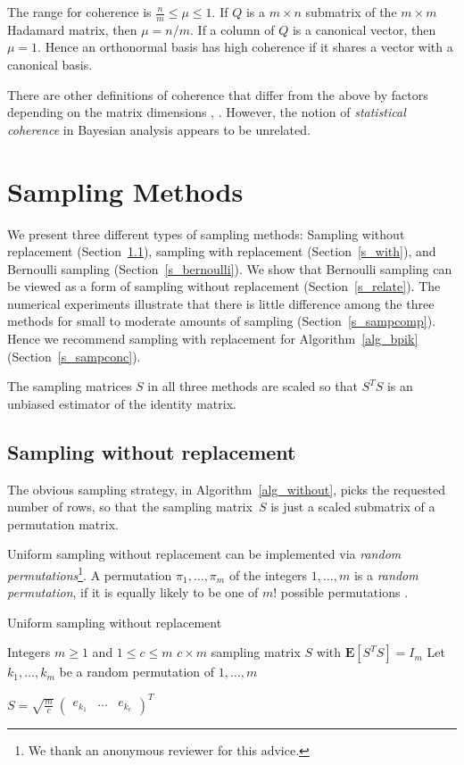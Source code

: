 \documentclass{siamltex}
\begin{document}
The range for coherence is $\tfrac{n}{m}\leq \mu\leq 1$.  If $Q$ is a
$m\times n$ submatrix of the $m\times m$ Hadamard matrix, then
$\mu=n/m$.  If a column of $Q$ is a canonical vector, then $\mu=1$.
Hence an orthonormal basis has high coherence if it shares a vector
with a canonical basis.  
 

There are other
definitions of coherence that differ from the above by factors
depending on the matrix dimensions \cite[Definition 1]{Recht11},
\cite[Definition 1]{TalR10}. However, the notion of 
\textit{statistical coherence} in Bayesian analysis
\cite{Lind78} appears to be unrelated.

 

\section{Sampling Methods}\label{s_samp}
We present three different types of sampling methods: 
Sampling without replacement
(Section~\ref{s_without}),
sampling with replacement  (Section~\ref{s_with}),
and Bernoulli sampling (Section~\ref{s_bernoulli}).
We show that Bernoulli sampling 
can be viewed as a form of sampling
without replacement (Section~\ref{s_relate}).
The numerical experiments   illustrate
that there is little difference among the three methods
for small to moderate amounts of sampling (Section~\ref{s_sampcomp}). 
Hence we recommend sampling with replacement 
for Algorithm~\ref{alg_bpik} (Section~\ref{s_sampconc}).

The sampling matrices $S$ in all three methods are scaled so that $S^TS$
is an unbiased estimator of the identity matrix.

\subsection{Sampling without replacement}\label{s_without}
The obvious sampling strategy, in Algorithm~\ref{alg_without},
picks the requested number of
rows, so that the sampling matrix~$S$ is just a scaled submatrix of a 
permutation matrix.

Uniform sampling without replacement can be implemented via 
\textit{random permutations}\footnote{We thank an
anonymous reviewer for this advice.}.
A permutation $\pi_1,\ldots, \pi_m$ of the integers $1,\ldots, m$
is a \textit{random permutation}, if it is equally likely to be one of $m!$
possible permutations \cite[pages 41 and 48]{MitzUpf}.

\begin{algorithm}
\caption{Uniform sampling without replacement
\cite{GT11,GrN10}}\label{alg_without}
\begin{algorithmic}
\REQUIRE Integers $m\geq 1$ and $1\leq c\leq m$
\ENSURE $c\times m$ sampling matrix $S$ with ${\mathbf{E}}[S^TS]=I_m$
\STATE
\STATE Let $k_1,\ldots,k_m$ be a random permutation of $1,\ldots, m$
\smallskip

\STATE $S=\sqrt{\tfrac{m}{c}}\>
\begin{pmatrix}e_{k_1} & \ldots & e_{k_c}\end{pmatrix}^T$
\end{algorithmic}
\end{algorithm}
\end{document}
